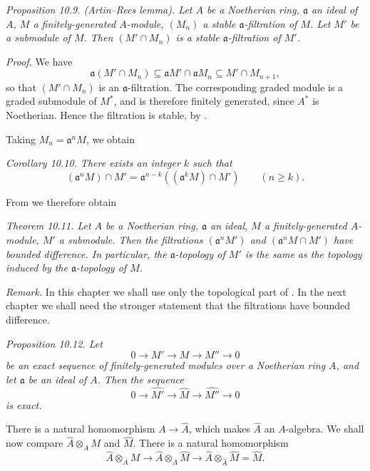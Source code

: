 \noindent\textit{Proposition 10.9. (Artin--Rees lemma). Let $A$ be a Noetherian ring, $\mathfrak a$ an ideal of $A$, $M$ a finitely-generated $A$-module, $(M_n)$ a stable $\mathfrak a$-filtration of $M$. Let $M'$ be a submodule of $M$. Then $(M'\cap M_n)$ is a stable $\mathfrak a$-filtration of $M'$.}

\noindent\textit{Proof.} We have
\[
\mathfrak a(M'\cap M_n)\subseteq\mathfrak aM'\cap\mathfrak aM_n\subseteq M'\cap M_{n+1},
\]
so that $(M'\cap M_n)$ is an $\mathfrak a$-filtration. The corresponding graded module is a graded submodule of $M^*$, and is therefore finitely generated, since $A^*$ is Noetherian. Hence the filtration is stable, by . \proofbox

Taking $M_n=\mathfrak a^nM$, we obtain

\noindent\textit{Corollary 10.10. There exists an integer $k$ such that}
\[
(\mathfrak a^nM)\cap M'=\mathfrak a^{n-k}((\mathfrak a^kM)\cap M')\qquad(n\geq k).
\]
\proofbox

From  we therefore obtain

\noindent\textit{Theorem 10.11. Let $A$ be a Noetherian ring, $\mathfrak a$ an ideal, $M$ a finitely-generated $A$-module, $M'$ a submodule. Then the filtrations $(\mathfrak a^nM')$ and $(\mathfrak a^nM\cap M')$ have bounded difference. In particular, the $\mathfrak a$-topology of $M'$ is the same as the topology induced by the $\mathfrak a$-topology of $M$.} \proofbox

\noindent\textit{Remark.} In this chapter we shall use only the topological part of . In the next chapter we shall need the stronger statement that the filtrations have bounded difference.

\noindent\textit{Proposition 10.12. Let}
\[
0\longrightarrow M'\longrightarrow M\longrightarrow M''\longrightarrow0
\]
\textit{be an exact sequence of finitely-generated modules over a Noetherian ring $A$, and let $\mathfrak a$ be an ideal of $A$. Then the sequence}
\[
0\longrightarrow\widehat{M'}\longrightarrow\widehat M\longrightarrow\widehat{M''}\longrightarrow0
\]
\textit{is exact.} \proofbox

There is a natural homomorphism $A\longrightarrow\widehat A$, which makes $\widehat A$ an $A$-algebra. We shall now compare $\widehat A\otimes_AM$ and $\widehat M$. There is a natural homomorphism
\[
\widehat A\otimes_AM\longrightarrow\widehat A\otimes_A\widehat M\longrightarrow\widehat A\otimes_{\widehat A}\widehat M=\widehat M.
\]

